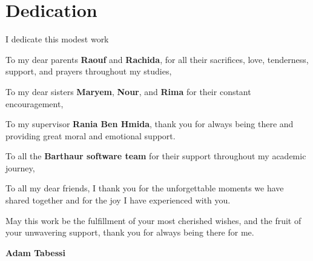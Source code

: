 \chapter*{Dedication}

\begin{center}
\vspace*{2cm}

I dedicate this modest work

\vspace{1cm}

To my dear parents \textbf{Raouf} and \textbf{Rachida}, for all their sacrifices, love, tenderness, support, and prayers throughout my studies,

\vspace{0.5cm}

To my dear sisters \textbf{Maryem}, \textbf{Nour}, and \textbf{Rima} for their constant encouragement,

\vspace{0.5cm}

To my supervisor \textbf{Rania Ben Hmida}, thank you for always being there and providing great moral and emotional support.

\vspace{0.5cm}

To all the \textbf{Barthaur software team} for their support throughout my academic journey,

\vspace{0.5cm}

To all my dear friends, I thank you for the unforgettable moments we have shared together and for the joy I have experienced with you.

\vspace{1cm}

May this work be the fulfillment of your most cherished wishes, and the fruit of your unwavering support, thank you for always being there for me.

\vspace{1.5cm}

\textbf{Adam Tabessi}

\end{center} 